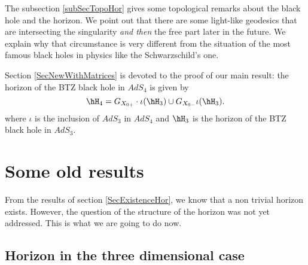 The subsection \ref{subSecTopoHor} gives some topological remarks about the black hole and the horizon. We point out that there are some light-like geodesics that are intersecting the singularity \emph{and then} the free part later in the future. We explain why that circumstance is very different from the situation of the most famous black holes in physics like the Schwarzschild's one.

Section \ref{SecNewWithMatrices} is devoted to the proof of our main result: the horizon of the BTZ black hole in $AdS_4$ is given by
\begin{equation}
	\hH_4=G_{X_{0+}}\cdot \iota(\hH_3)\cup G_{X_{0-}}\iota(\hH_3).
\end{equation}
where $\iota$ is the inclusion of $AdS_3$ in $AdS_4$ and $\hH_3$ is the horizon of the BTZ black hole in $AdS_3$.

\section{Some old results}
\label{SecOldResults}

From the results of section \ref{SecExistenceHor}, we know that a non trivial horizon exists. However, the question of the structure of the horizon was not yet addressed. This is what we are going to do now.

\subsection{Horizon in the three dimensional case}
\label{SubSecHorInThreeDimensionOld}

